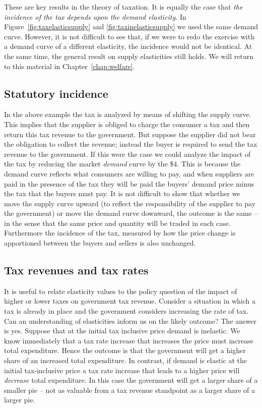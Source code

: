 These are key results in the theory of taxation. It is equally the case that \textit{the incidence of the tax depends upon the demand elasticity}. In Figure~\ref{fig:taxelasticsupply} and \ref{fig:taxinelasticsupply} we used the same demand curve. However, it is not difficult to see that, if we were to redo the exercise with a demand curve of a different elasticity, the incidence would not be identical. At the same time, the general result on supply elasticities still holds. We will return to this material in Chapter~\ref{chap:welfare}. 

\subsection*{Statutory incidence}

In the above example the tax is analyzed by means of shifting the supply curve. This implies that the supplier is obliged to charge the consumer a tax and then return this tax revenue to the government. But suppose the supplier did not bear the obligation to collect the revenue; instead the buyer is required to send the tax revenue to the government. If this were the case we could analyze the impact of the tax by reducing the market \textit{demand} curve by the \$4. This is because the demand curve reflects what consumers are willing to pay, and when suppliers are paid in the presence of the tax they will be paid the buyers' demand price minus the tax that the buyers must pay. It is not difficult to show that whether we move the supply curve upward (to reflect the responsibility of the supplier to pay the government) or move the demand curve downward, the outcome is the same -- in the sense that the same price and quantity will be traded in each case. Furthermore the incidence of the tax, measured by how the price change is apportioned between the buyers and sellers is also unchanged. 

\subsection*{Tax revenues and tax rates}

It is useful to relate elasticity values to the policy question of the impact of higher or lower taxes on government tax revenue. Consider a situation in which a tax is already in place and the government considers increasing the rate of tax. Can an understanding of elasticities inform us on the likely outcome? The answer is yes. Suppose that at the initial tax inclusive price demand is inelastic. We know immediately that a tax rate increase that increases the price must increase total expenditure. Hence the outcome is that the government will get a higher share of an increased total expenditure. In contrast, if demand is elastic at the initial tax-inclusive price a tax rate increase that leads to a higher price will \textit{decrease} total expenditure. In this case the government will get a larger share of a smaller pie -- not as valuable from a tax revenue standpoint as a larger share of a larger pie.
